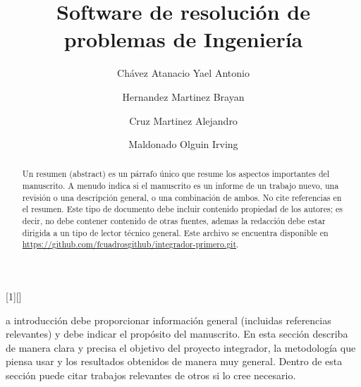 \documentclass{IEEEcsmag}
\begin{document}
[1][]
{}
{}



\title{Software de resolución de problemas de Ingeniería }

\author{Chávez Atanacio Yael Antonio}

\author{Hernandez Martinez Brayan}

\author{Cruz Martinez Alejandro}

\author{Maldonado Olguin Irving}



\begin{abstract}
Un resumen (abstract) es un párrafo único que resume los aspectos importantes del manuscrito. A menudo indica si el manuscrito es un informe de un trabajo nuevo, una revisión o una descripción general, o una combinación de ambos. No cite referencias en el resumen. Este tipo de documento debe incluir contenido propiedad de los autores; es decir, no debe contener contenido de otras fuentes, ademas la redacción debe  estar dirigida a un tipo de lector técnico general. Este archivo se encuentra disponible en \href{https://github.com/fcuadrosgithub/integrador-primero.git}{https://github.com/fcuadrosgithub/integrador-primero.git}.
\end{abstract}

\maketitle
{}a introducción debe proporcionar información general (incluidas referencias relevantes) y debe indicar el propósito del manuscrito. En esta sección describa de manera clara y precisa el objetivo del proyecto integrador, la metodología que piensa usar y los resultados obtenidos de manera muy general. Dentro de esta sección puede citar trabajos relevantes de otros si lo cree necesario.
\end{document}
